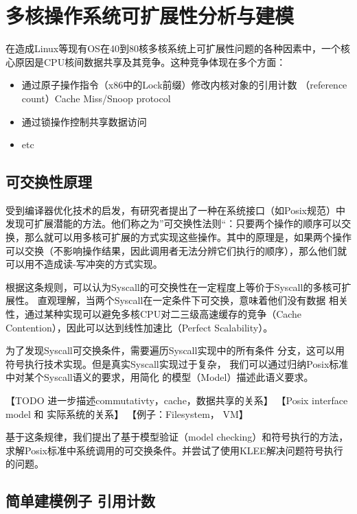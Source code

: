 
\chapter{多核操作系统可扩展性分析与建模}


在造成Linux等现有OS在40到80核多核系统上可扩展性问题的各种因素中，一个核心原因是CPU核间数据共享及其竞争。这种竞争体现在多个方面：

\begin{itemize}
\item 通过原子操作指令（x86中的Lock前缀）修改内核对象的引用计数
（reference count）Cache Miss/Snoop protocol
\item 通过锁操作控制共享数据访问
\item etc
\end{itemize}

\section{可交换性原理}

受到编译器优化技术的启发，有研究者提出了一种在系统接口（如Posix规范）中发现可扩展潜能的方法\cite{commuter:2013}。他们称之为”可交换性法则“：只要两个操作的顺序可以交换，那么就可以用多核可扩展的方式实现这些操作。其中的原理是，如果两个操作可以交换（不影响操作结果，因此调用者无法分辨它们执行的顺序），那么他们就可以用不造成读-写冲突的方式实现。

根据这条规则，可以认为Syscall的可交换性在一定程度上等价于Syscall的多核可扩展性。
直观理解，当两个Syscall在一定条件下可交换，意味着他们没有数据
相关性，通过某种实现可以避免多核CPU对二三级高速缓存的竞争（Cache
Contention），因此可以达到线性加速比（Perfect
Scalability）。

为了发现Syscall可交换条件，需要遍历Syscall实现中的所有条件
分支，这可以用符号执行技术实现。但是真实Syscall实现过于复杂，
我们可以通过归纳Posix标准中对某个Syscall语义的要求，用简化
的模型（Model）描述此语义要求。

【TODO 进一步描述commutativty，cache，数据共享的关系】
【Posix interface model 和 实际系统的关系】
【例子：Filesystem， VM】

基于这条规律，我们提出了基于模型验证（model
checking）和符号执行的方法，求解Posix标准中系统调用的可交换条件。并尝试了使用KLEE\cite{Cadar:2008:KUA:1855741.1855756}解决问题符号执行的问题。

\section{简单建模例子 \pozhehao 引用计数}
